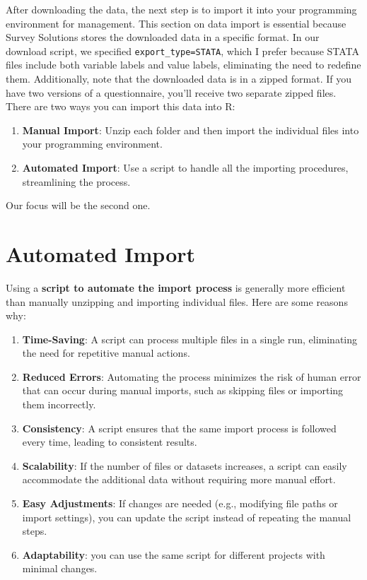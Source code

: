 \documentclass[
  letterpaper,
  DIV=11,
  numbers=noendperiod]{scrreprt}
\begin{document}
After downloading the data, the next step is to import it into your
programming environment for management. This section on data import is
essential because Survey Solutions stores the downloaded data in a
specific format. In our download script, we specified
\texttt{export\_type=\textquotesingle{}STATA\textquotesingle{}}, which I
prefer because STATA files include both variable labels and value
labels, eliminating the need to redefine them. Additionally, note that
the downloaded data is in a zipped format. If you have two versions of a
questionnaire, you'll receive two separate zipped files. There are two
ways you can import this data into R:

\begin{enumerate}
\def\labelenumi{\arabic{enumi}.}
\item
  \textbf{Manual Import}: Unzip each folder and then import the
  individual files into your programming environment.
\item
  \textbf{Automated Import}: Use a script to handle all the importing
  procedures, streamlining the process.
\end{enumerate}

Our focus will be the second one.

\section{Automated Import}\label{automated-import}

Using a \textbf{script to automate the import process} is generally more
efficient than manually unzipping and importing individual files. Here
are some reasons why:

\begin{enumerate}
\def\labelenumi{\arabic{enumi}.}
\item
  \textbf{Time-Saving}: A script can process multiple files in a single
  run, eliminating the need for repetitive manual actions.
\item
  \textbf{Reduced Errors}: Automating the process minimizes the risk of
  human error that can occur during manual imports, such as skipping
  files or importing them incorrectly.
\item
  \textbf{Consistency}: A script ensures that the same import process is
  followed every time, leading to consistent results.
\item
  \textbf{Scalability}: If the number of files or datasets increases, a
  script can easily accommodate the additional data without requiring
  more manual effort.
\item
  \textbf{Easy Adjustments}: If changes are needed (e.g., modifying file
  paths or import settings), you can update the script instead of
  repeating the manual steps.
\item
  \textbf{Adaptability}: you can use the same script for different
  projects with minimal changes.
\end{enumerate}
\end{document}
